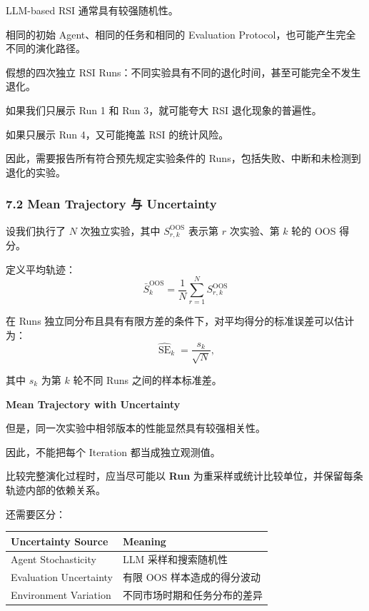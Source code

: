 LLM-based RSI 通常具有较强随机性。

相同的初始 Agent、相同的任务和相同的 Evaluation Protocol，也可能产生完全不同的演化路径。


假想的四次独立 RSI Runs：不同实验具有不同的退化时间，甚至可能完全不发生退化。

如果我们只展示 Run 1 和 Run 3，就可能夸大 RSI 退化现象的普遍性。

如果只展示 Run 4，又可能掩盖 RSI 的统计风险。

因此，需要报告所有符合预先规定实验条件的 Runs，包括失败、中断和未检测到退化的实验。

\hypertarget{part-3-48-0001-mean-trajectory-ux4e0e-uncertainty}{%
\subsubsection{7.2 Mean Trajectory 与 Uncertainty}\label{part-3-48-0001-mean-trajectory-ux4e0e-uncertainty}}

设我们执行了 \(N\) 次独立实验，其中 \(S_{r,k}^{\mathrm{OOS}}\) 表示第 \(r\) 次实验、第 \(k\) 轮的 OOS 得分。

定义平均轨迹：
\[\boxed{
\bar S_k^{\mathrm{OOS}}
=
\frac1N\sum_{r=1}^{N}
S_{r,k}^{\mathrm{OOS}}
}\]

在 Runs 独立同分布且具有有限方差的条件下，对平均得分的标准误差可以估计为：
\[\widehat{\operatorname{SE}}_k
=
\frac{s_k}{\sqrt N},\]

其中 \(s_k\) 为第 \(k\) 轮不同 Runs 之间的样本标准差。

\textbf{Mean Trajectory with Uncertainty}


但是，同一次实验中相邻版本的性能显然具有较强相关性。

因此，不能把每个 Iteration 都当成独立观测值。

比较完整演化过程时，应当尽可能以 \textbf{Run} 为重采样或统计比较单位，并保留每条轨迹内部的依赖关系。

还需要区分：

\begin{readertable}
\begin{longtable}[]{@{}
  >{\raggedright\arraybackslash}p{}
  >{\raggedright\arraybackslash}p{}@{}}
\toprule
Uncertainty Source & Meaning \\
\midrule
\endhead
Agent Stochasticity & LLM 采样和搜索随机性 \\
Evaluation Uncertainty & 有限 OOS 样本造成的得分波动 \\
Environment Variation & 不同市场时期和任务分布的差异 \\
\bottomrule
\end{longtable}
\end{readertable}

